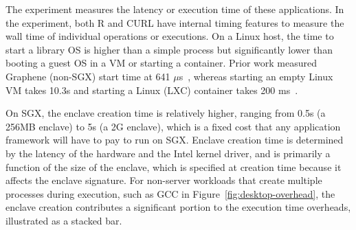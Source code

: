 The experiment measures the latency or execution time of these applications. 
In the experiment, both R and CURL have internal timing features to measure the wall time
of individual operations or executions.
On a Linux host, the time to start a library OS is higher than a simple 
process but significantly lower than booting a guest OS in a VM or
starting a container. 
Prior work measured Graphene (non-SGX) start time at 641 $\mu$s~\cite{tsai14graphene}, whereas starting an empty Linux VM takes 10.3s and starting a Linux (LXC) container takes 200 ms~\cite{agarwal15container}. 


On SGX, the enclave creation time is relatively higher,  ranging from 0.5s (a 256MB enclave) to 5s (a 2G enclave), which is a fixed cost that any application framework
will have to pay to run on SGX.
Enclave creation time is determined by the latency of the hardware and the Intel kernel driver, and is primarily a function of the size of 
the enclave, which is specified at creation time because it affects the enclave signature. %
For non-server workloads that create multiple processes during execution,
such as GCC in Figure~\ref{fig:desktop-overhead},
the enclave creation contributes a significant portion to the execution time overheads, illustrated as a stacked bar.



